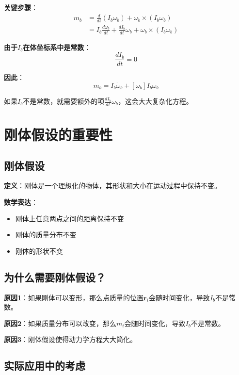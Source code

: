 \documentclass[12pt,a4paper]{article}
\begin{document}
\textbf{关键步骤}：
\begin{align}
m_b &= \frac{d}{dt}(I_b \omega_b) + \omega_b \times (I_b \omega_b) \\
&= I_b \frac{d\omega_b}{dt} + \frac{dI_b}{dt} \omega_b + \omega_b \times (I_b \omega_b)
\end{align}

\textbf{由于$I_b$在体坐标系中是常数}：
\begin{equation}
\frac{dI_b}{dt} = 0
\end{equation}

\textbf{因此}：
\begin{equation}
m_b = I_b \dot{\omega}_b + [\omega_b] I_b \omega_b
\end{equation}

如果$I_b$不是常数，就需要额外的项$\frac{dI_b}{dt} \omega_b$，这会大大复杂化方程。

\section{刚体假设的重要性}

\subsection{刚体假设}

\textbf{定义}：刚体是一个理想化的物体，其形状和大小在运动过程中保持不变。

\textbf{数学表达}：
\begin{itemize}
\item 刚体上任意两点之间的距离保持不变
\item 刚体的质量分布不变
\item 刚体的形状不变
\end{itemize}

\subsection{为什么需要刚体假设？}

\textbf{原因1}：如果刚体可以变形，那么点质量的位置$\bm{r}_i$会随时间变化，导致$I_b$不是常数。

\textbf{原因2}：如果质量分布可以改变，那么$m_i$会随时间变化，导致$I_b$不是常数。

\textbf{原因3}：刚体假设使得动力学方程大大简化。

\subsection{实际应用中的考虑}
\end{document}
